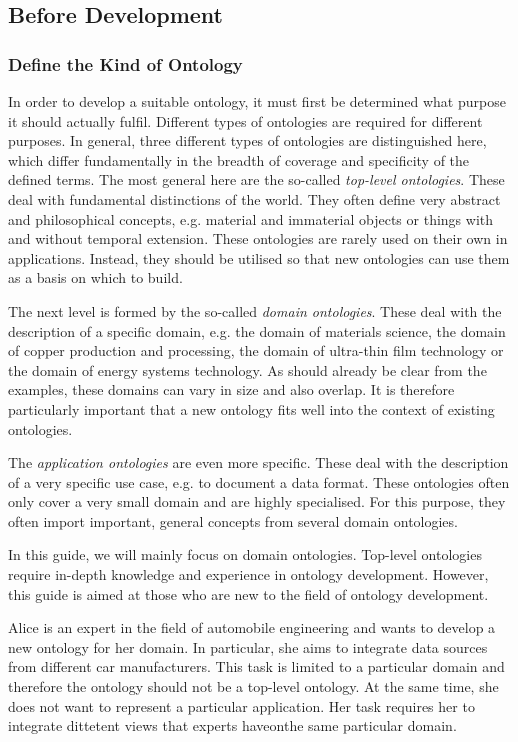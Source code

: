 \subsection{Before Development}

\subsubsection{Define the Kind of Ontology}
\label{sssec:ontologykind}

In order to develop a suitable ontology, it must first be determined what purpose it should actually fulfil. Different types of ontologies are required for different purposes. In general, three different types of ontologies are distinguished here, which differ fundamentally in the breadth of coverage and specificity of the defined terms.
The most general here are the so-called \textit{top-level ontologies}. These deal with fundamental distinctions of the world. They often define very abstract and philosophical concepts, e.g. material and immaterial objects or things with and without temporal extension. These ontologies are rarely used on their own in applications. Instead, they should be utilised so that new ontologies can use them as a basis on which to build.

The next level is formed by the so-called \textit{domain ontologies}. These deal with the description of a specific domain, e.g. the domain of materials science, the domain of copper production and processing, the domain of ultra-thin film technology or the domain of energy systems technology. As should already be clear from the examples, these domains can vary in size and also overlap. It is therefore particularly important that a new ontology fits well into the context of existing ontologies.

The \textit{application ontologies} are even more specific. These deal with the description of a very specific use case, e.g. to document a data format. These ontologies often only cover a very small domain and are highly specialised. For this purpose, they often import important, general concepts from several domain ontologies.

In this guide, we will mainly focus on domain ontologies. Top-level ontologies require in-depth knowledge and experience in ontology development. However, this guide is aimed at those who are new to the field of ontology development.


\begin{example}
Alice is an expert in the field of automobile engineering and wants to develop a new ontology for her domain. In particular, she aims to integrate data sources from different car manufacturers. This task is limited to a particular domain and therefore the ontology should not be a top-level ontology. At the same time, she does not want to represent a particular application. Her task requires her to integrate dittetent views that experts haveonthe same particular domain.


\end{example}

